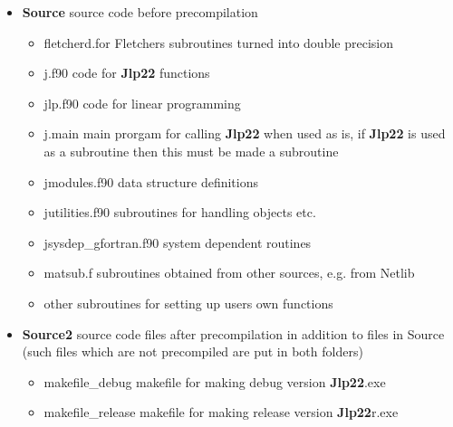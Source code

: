 \begin{itemize}
\item \textbf{Source} \hspace{0.2cm} source code before precompilation 
\begin{itemize} 
\item fletcherd.for \hspace{0.2cm}Fletchers subroutines turned into double precision 
\item j.f90 \hspace{0.2cm}code for \textbf{Jlp22} functions 
\item jlp.f90 \hspace{0.2cm}code for linear programming 
\item j.main \hspace{0.2cm}main prorgam for calling \textbf{Jlp22} when used as is, if \textbf{Jlp22} is used as 
a subroutine then this must be made a subroutine 
\item jmodules.f90 \hspace{0.2cm}data structure definitions 
\item jutilities.f90 \hspace{0.2cm}subroutines for handling objects etc. 
\item jsysdep\_gfortran.f90 \hspace{0.2cm}system dependent routines 
\item matsub.f \hspace{0.2cm}subroutines obtained from other sources, e.g. from Netlib 
\item other subroutines for setting up users own  functions 
\end{itemize} 
 
\item\textbf{Source2} \hspace{0.2cm} source code files after precompilation 
in addition to files in Source (such files which are not precompiled are put in both folders) 
\begin{itemize} 
\item makefile\_debug \hspace{0.2cm}makefile for making debug version \textbf{Jlp22}.exe 
\item makefile\_release\hspace{0.2cm} makefile for making release version \textbf{Jlp22}r.exe 
\end{itemize} 
 

\end{itemize}
